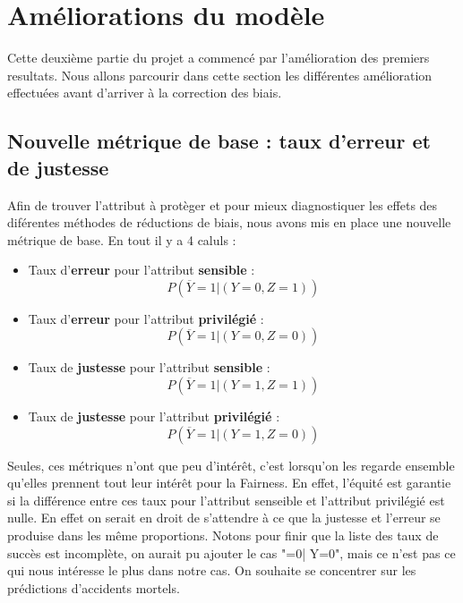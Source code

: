 \documentclass{article}
\begin{document}
    \section{Améliorations du modèle}
    Cette deuxième partie du projet a commencé par l'amélioration des premiers resultats. Nous allons parcourir 
    dans cette section les différentes amélioration effectuées avant d'arriver à la correction des biais.

    \subsection{Nouvelle métrique de base : taux d'erreur et de justesse}

    Afin de trouver l'attribut à protèger et pour mieux diagnostiquer les effets des diférentes méthodes de réductions de
    biais, nous avons mis en place une nouvelle métrique de base. En tout il y a 4 caluls : 

    \begin{itemize}
        \item Taux d'\textbf{erreur} pour l'attribut \textbf{sensible} : \[ P(\overline{Y}=1| (Y=0, Z=1)) \]
        \item Taux d'\textbf{erreur} pour l'attribut \textbf{privilégié} : \[ P(\overline{Y}=1| (Y=0, Z=0)) \]
        \item Taux de \textbf{justesse} pour l'attribut \textbf{sensible} : \[ P(\overline{Y}=1| (Y=1, Z=1)) \]
        \item Taux de \textbf{justesse} pour l'attribut \textbf{privilégié} : \[ P(\overline{Y}=1| (Y=1, Z=0)) \]
    \end{itemize}

    Seules, ces métriques n'ont que peu d'intérêt, c'est lorsqu'on les regarde ensemble qu'elles prennent tout leur intérêt pour 
    la Fairness. En effet, l'équité est garantie si la différence entre ces taux pour l'attribut senseible et l'attribut privilégié 
    est nulle. En effet on serait en droit de s'attendre à ce que la justesse et l'erreur se produise dans les même proportions. 
    Notons pour finir que la liste des taux de succès est incomplète, on aurait pu ajouter le cas "=0| Y=0", mais ce n'est pas ce qui 
    nous intéresse le plus dans notre cas. On souhaite se concentrer sur les prédictions d'accidents mortels.
\end{document}
